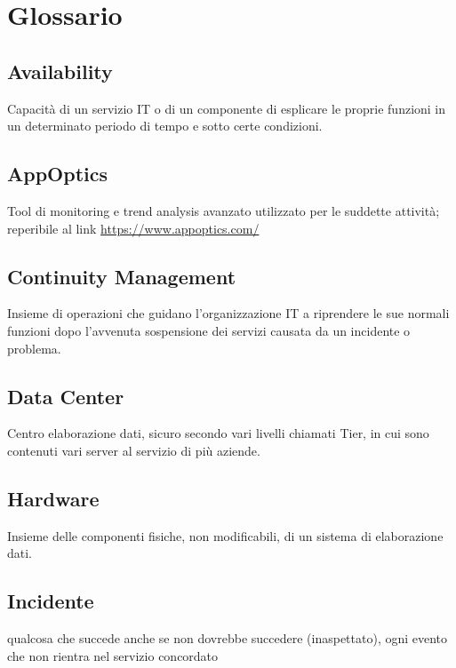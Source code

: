 \newpage

\section{Glossario} \label{ref:glossario}

\subsection*{Availability}

Capacità di un servizio IT o di un componente di esplicare le proprie funzioni in un determinato periodo di tempo e sotto certe condizioni.


\subsection*{AppOptics}

Tool di monitoring e trend analysis avanzato utilizzato per le suddette attività; reperibile al link \href{https://www.appoptics.com/}{https://www.appoptics.com/}



\subsection*{Continuity Management}

Insieme di operazioni che guidano l'organizzazione IT a riprendere le sue normali funzioni dopo l'avvenuta sospensione dei servizi causata da un incidente o problema.


\subsection*{Data Center}
Centro elaborazione dati, sicuro secondo vari livelli chiamati Tier, in cui sono contenuti vari server al servizio di più aziende.


\subsection*{Hardware}
Insieme delle componenti fisiche, non modificabili, di un sistema di elaborazione dati.

\subsection*{Incidente} 
qualcosa che succede anche se non dovrebbe succedere (inaspettato), ogni evento che non rientra nel servizio concordato


